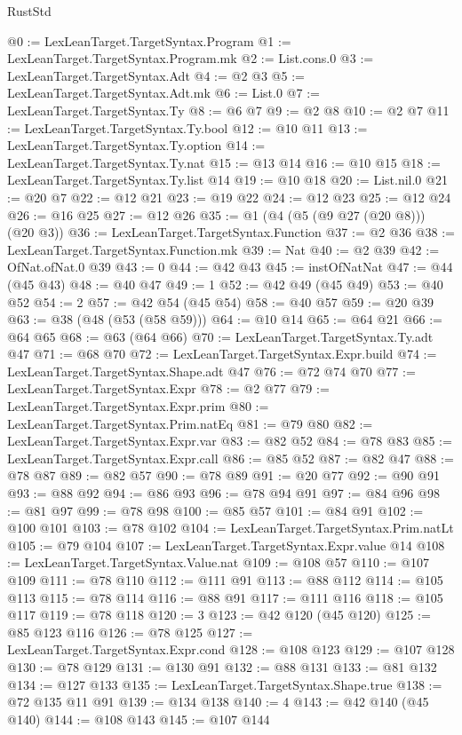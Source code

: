\begin{lexlean}{RustStd}
\begin{coremodule}
@0 := LexLeanTarget.TargetSyntax.Program
@1 := LexLeanTarget.TargetSyntax.Program.mk
@2 := List.cons.{0}
@3 := LexLeanTarget.TargetSyntax.Adt
@4 := @2 @3
@5 := LexLeanTarget.TargetSyntax.Adt.mk
@6 := List.{0}
@7 := LexLeanTarget.TargetSyntax.Ty
@8 := @6 @7
@9 := @2 @8
@10 := @2 @7
@11 := LexLeanTarget.TargetSyntax.Ty.bool
@12 := @10 @11
@13 := LexLeanTarget.TargetSyntax.Ty.option
@14 := LexLeanTarget.TargetSyntax.Ty.nat
@15 := @13 @14
@16 := @10 @15
@18 := LexLeanTarget.TargetSyntax.Ty.list @14
@19 := @10 @18
@20 := List.nil.{0}
@21 := @20 @7
@22 := @12 @21
@23 := @19 @22
@24 := @12 @23
@25 := @12 @24
@26 := @16 @25
@27 := @12 @26
@35 := @1 (@4 (@5 (@9 @27 (@20 @8))) (@20 @3))
@36 := LexLeanTarget.TargetSyntax.Function
@37 := @2 @36
@38 := LexLeanTarget.TargetSyntax.Function.mk
@39 := Nat
@40 := @2 @39
@42 := OfNat.ofNat.{0} @39
@43 := 0
@44 := @42 @43
@45 := instOfNatNat
@47 := @44 (@45 @43)
@48 := @40 @47
@49 := 1
@52 := @42 @49 (@45 @49)
@53 := @40 @52
@54 := 2
@57 := @42 @54 (@45 @54)
@58 := @40 @57
@59 := @20 @39
@63 := @38 (@48 (@53 (@58 @59)))
@64 := @10 @14
@65 := @64 @21
@66 := @64 @65
@68 := @63 (@64 @66)
@70 := LexLeanTarget.TargetSyntax.Ty.adt @47
@71 := @68 @70
@72 := LexLeanTarget.TargetSyntax.Expr.build
@74 := LexLeanTarget.TargetSyntax.Shape.adt @47
@76 := @72 @74 @70
@77 := LexLeanTarget.TargetSyntax.Expr
@78 := @2 @77
@79 := LexLeanTarget.TargetSyntax.Expr.prim
@80 := LexLeanTarget.TargetSyntax.Prim.natEq
@81 := @79 @80
@82 := LexLeanTarget.TargetSyntax.Expr.var
@83 := @82 @52
@84 := @78 @83
@85 := LexLeanTarget.TargetSyntax.Expr.call
@86 := @85 @52
@87 := @82 @47
@88 := @78 @87
@89 := @82 @57
@90 := @78 @89
@91 := @20 @77
@92 := @90 @91
@93 := @88 @92
@94 := @86 @93
@96 := @78 @94 @91
@97 := @84 @96
@98 := @81 @97
@99 := @78 @98
@100 := @85 @57
@101 := @84 @91
@102 := @100 @101
@103 := @78 @102
@104 := LexLeanTarget.TargetSyntax.Prim.natLt
@105 := @79 @104
@107 := LexLeanTarget.TargetSyntax.Expr.value @14
@108 := LexLeanTarget.TargetSyntax.Value.nat
@109 := @108 @57
@110 := @107 @109
@111 := @78 @110
@112 := @111 @91
@113 := @88 @112
@114 := @105 @113
@115 := @78 @114
@116 := @88 @91
@117 := @111 @116
@118 := @105 @117
@119 := @78 @118
@120 := 3
@123 := @42 @120 (@45 @120)
@125 := @85 @123 @116
@126 := @78 @125
@127 := LexLeanTarget.TargetSyntax.Expr.cond
@128 := @108 @123
@129 := @107 @128
@130 := @78 @129
@131 := @130 @91
@132 := @88 @131
@133 := @81 @132
@134 := @127 @133
@135 := LexLeanTarget.TargetSyntax.Shape.true
@138 := @72 @135 @11 @91
@139 := @134 @138
@140 := 4
@143 := @42 @140 (@45 @140)
@144 := @108 @143
@145 := @107 @144

\end{coremodule}
\end{lexlean}
